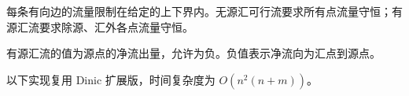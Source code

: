 每条有向边的流量限制在给定的上下界内。无源汇可行流要求所有点流量守恒；有源汇流要求除源、汇外各点流量守恒。

有源汇流的值为源点的净流出量，允许为负。负值表示净流向为汇点到源点。

以下实现复用 Dinic 扩展版，时间复杂度为 $O(n^2(n+m))$。

